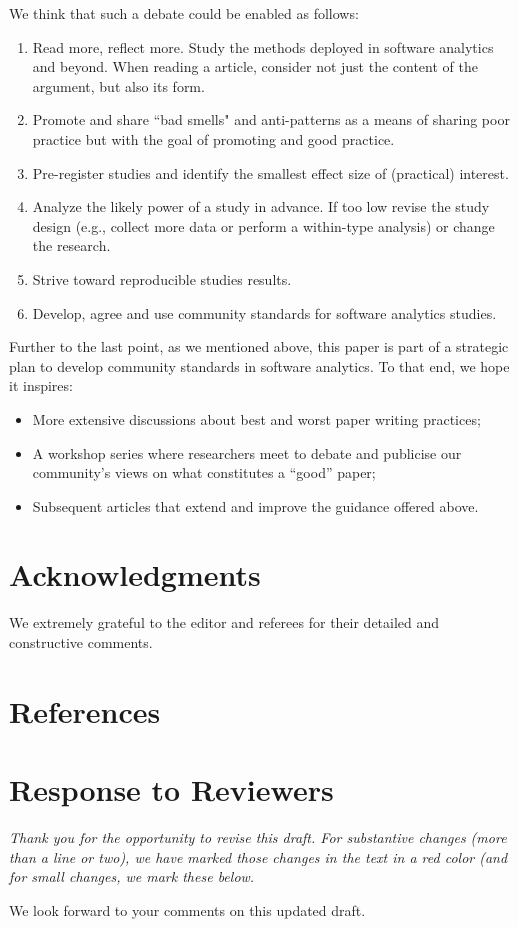 \documentclass[10pt]{elsarticle}
\newcommand{\bi}{\begin{itemize}}
\newcommand{\ei}{\end{itemize}}
\newcommand{\RRED}{\color{red}}
\newcommand{\BLACK}{\color{black}}
\begin{document}
We think that such a debate could be enabled as follows:
\begin{enumerate}
    \item Read more, reflect more. Study the methods deployed in software analytics and beyond.%
    When reading a article, consider not just the content of the argument, but also its form.
    \item Promote and share ``bad smells" and anti-patterns as a means of sharing poor practice but with the goal of promoting and good practice.
    \item Pre-register studies and identify the smallest effect size of (practical) interest.
    \item Analyze the likely power of a study in advance. If too low  revise the study design (e.g., collect more data or perform a within-type analysis) or change the research.
    \item Strive toward reproducible studies
    results.
     \item Develop, agree and use community standards  for software analytics studies.
     \end{enumerate}
Further to the last point, as we mentioned above, this paper is part of a strategic plan to develop community standards in software analytics.  To that end, we hope it inspires:
     \bi
     \item More  extensive discussions about best and worst paper writing practices; 
\item A workshop series where researchers meet to debate and publicise our community's views on what constitutes a ``good''  paper;
\item Subsequent articles
that extend and improve the guidance offered above.
\ei
  
\section*{Acknowledgments}
\noindent
We extremely grateful to the editor and referees for their detailed and constructive comments.



\section*{References}


 
 
\newpage
\section*{Response to Reviewers}
{\em  Thank you for the opportunity to revise this draft. For substantive changes (more than a line or two), we have marked those changes \RRED in the text in a red color \BLACK (and for small changes, we mark these below.

We look forward to your comments on this updated draft.}
\end{document}

